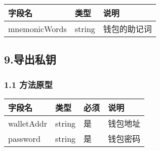 \documentclass[letterpaper,10pt,english]{sphinxmanual}
\begin{document}
\begin{savenotes}\sphinxattablestart
\centering
\begin{tabulary}{\linewidth}[t]{|T|T|T|}
\hline
\sphinxstyletheadfamily 
字段名
&\sphinxstyletheadfamily 
类型
&\sphinxstyletheadfamily 
说明
\\
\hline
mnemonicWords
&
string
&
钱包的助记词
\\
\hline
\end{tabulary}
\par
\sphinxattableend\end{savenotes}


\begin{sphinxVerbatim}[commandchars=\\\{\}]
     
\end{sphinxVerbatim}


\subsection{9.导出私钥}
\label{\detokenize{BCBWalletSDK_u63a5_u53e3_u8bf4_u660e:id41}}

\subsubsection{1.1 方法原型}
\label{\detokenize{BCBWalletSDK_u63a5_u53e3_u8bf4_u660e:id42}}



\begin{savenotes}\sphinxattablestart
\centering
\begin{tabulary}{\linewidth}[t]{|T|T|T|T|}
\hline
\sphinxstyletheadfamily 
字段名
&\sphinxstyletheadfamily 
类型
&\sphinxstyletheadfamily 
必须
&\sphinxstyletheadfamily 
说明
\\
\hline
walletAddr
&
string
&
是
&
钱包地址
\\
\hline
password
&
string
&
是
&
钱包密码
\\
\hline
\end{tabulary}
\par
\sphinxattableend\end{savenotes}
\end{document}
